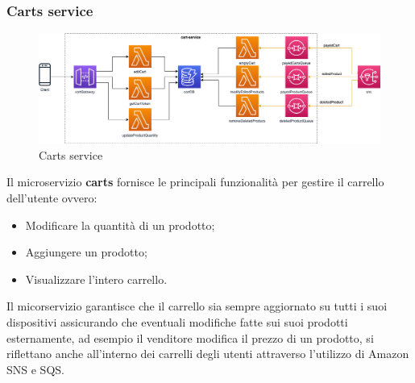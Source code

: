 \subsubsection{Carts service}
\begin{figure}[H]
	\centering
	\includegraphics[scale=0.4]{Immagini/Backend/AWSCart.png}
	\caption{Carts service}
	\label{fig:Cart}
\end{figure}
Il microservizio \textbf{carts} fornisce le principali funzionalità per gestire il carrello dell'utente ovvero:
\begin{itemize}
	\item Modificare la quantità di un prodotto;
	\item Aggiungere un prodotto;
	\item Visualizzare l'intero carrello.
\end{itemize}
Il micorservizio garantisce che il carrello sia sempre aggiornato su tutti i suoi dispositivi assicurando che eventuali modifiche fatte sui suoi prodotti esternamente, ad esempio il venditore modifica il prezzo di un prodotto, si riflettano anche all'interno dei carrelli degli utenti attraverso l'utilizzo di Amazon SNS e SQS.

